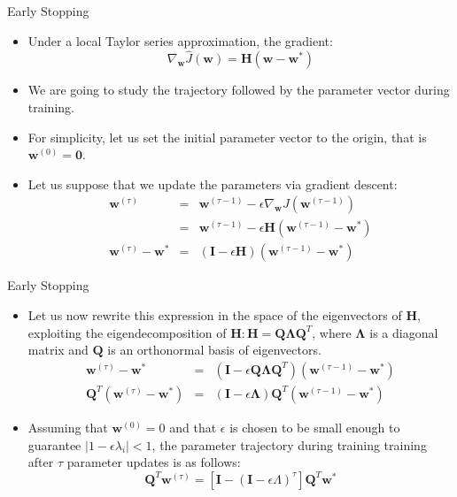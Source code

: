\documentclass[10pt]{beamer}
\begin{document}
	\begin{frame}{Early Stopping}
		\begin{itemize}
			\item Under a local Taylor series approximation, the gradient:
			$$\nabla_{\bm{w}}\hat{J}(\bm{w})=\bm{H}(\bm{w}-\bm{w}^*)$$
			
			\pause
			\item We are going to study the trajectory followed by the parameter vector during training.
			\pause
			\item For simplicity, let us set the initial parameter vector to the origin, that is $\bm{w}^{(0)}=\bm{0}$.
			\pause
			\item Let us suppose that we update the parameters via gradient descent:
			\begin{eqnarray*}
				\bm{w}^{(\tau)}&=&\bm{w}^{(\tau-1)}-\epsilon\nabla_{\bm{w}}J(\bm{w}^{(\tau-1)})\\
				&=&\bm{w}^{(\tau-1)}-\epsilon\bm{H}(\bm{w}^{(\tau-1)}-\bm{w}^*)\\
				\bm{w}^{(\tau)}-\bm{w}^*&=&(\bm{I}-\epsilon\bm{H})(\bm{w}^{(\tau-1)}-\bm{w}^*)
			\end{eqnarray*}
		\end{itemize}
	\end{frame}
	
	\begin{frame}{Early Stopping}
		\begin{itemize}
			\item Let us now rewrite this expression in the space of the eigenvectors of $\bm{H}$, exploiting the eigendecomposition of $\bm{H}: \bm{H}=\bm{Q\Lambda Q}^T$, where $\bm{\Lambda}$ is a diagonal matrix and $\bm{Q}$ is an orthonormal basis of eigenvectors.
			\begin{eqnarray*}
				\bm{w}^{(\tau)}-\bm{w}^*&=&(\bm{I}-\epsilon\bm{Q\Lambda Q}^T)(\bm{w}^{(\tau-1)}-\bm{w}^*)\\
				\bm{Q}^T(\bm{w}^{(\tau)}-\bm{w}^*)&=&(\bm{I}-\epsilon\bm{\Lambda})\bm{Q}^T(\bm{w}^{(\tau-1)}-\bm{w}^*)
			\end{eqnarray*}
			
			\pause
			\item Assuming that $\bm{w}^{(0)}=0$ and that $\epsilon$ is chosen to be small enough to guarantee $|1-\epsilon\lambda_i|<1$, the parameter trajectory during training training after $\tau$ parameter updates is as follows:
			$$\bm{Q}^T\bm{w}^{(\tau)}=\left[\bm{I}-(\bm{I}-\epsilon\Lambda)^{\tau}\right]\bm{Q}^T\bm{w}^*$$
		\end{itemize}
	\end{frame}
	
\end{document}
